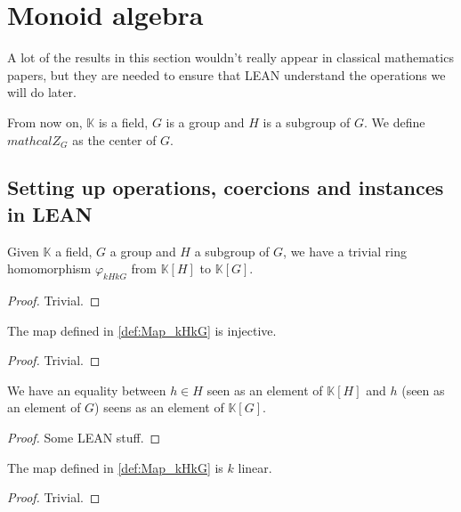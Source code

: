 \section{Monoid algebra}
A lot of the results in this section wouldn't really appear in classical mathematics papers, but they
are needed to ensure that LEAN understand the operations we will do later.
\newline

From now on, $\mathbb{K}$ is a field, $G$ is a group and $H$ is a subgroup of $G$.
We define $mathcal{Z}_G$ as the center of $G$.

\subsection{Setting up operations, coercions and instances in LEAN}

\begin{definition}
    \label{def:Map_kHkG}
    \uses{}
    \leanok
    Given $\mathbb{K}$ a field, $G$ a group and $H$ a subgroup of $G$, 
    we have a trivial ring homomorphism $\varphi_{kHkG}$ from $\mathbb{K}[H]$ to $\mathbb{K}[G]$.
    \begin{proof}
        \leanok
        Trivial.
    \end{proof}
\end{definition}

\begin{proposition}
    \label{prop:Map_kHkG_inj}
    \leanok
    The map defined in \ref{def:Map_kHkG} is injective.
\end{proposition}
\begin{proof}
    \leanok
    Trivial.
\end{proof}

\begin{proposition}
    \label{prop:Map_kHkG_single_apply}
    \leanok
    We have an equality between $h\in H$ seen as an element of $\mathbb{K}[H]$ and $h$ (seen as an element 
    of $G$) seens as an element of $\mathbb{K}[G]$.
\end{proposition}
\begin{proof}
    \leanok
    Some LEAN stuff.
\end{proof}

\begin{proposition}
    \label{prop:Map_kHkG_k_linear}
    \leanok
    The map defined in \ref{def:Map_kHkG} is $k$ linear.
\end{proposition}
\begin{proof}
    \leanok
    Trivial.
\end{proof}

